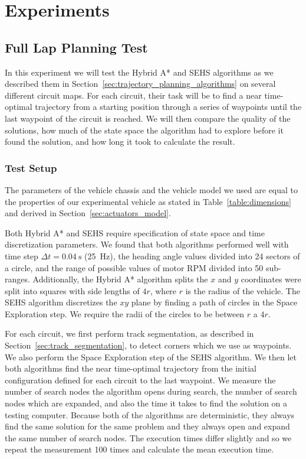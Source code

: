 \chapter{Experiments}
\label{chapter:experiments}


\section{Full Lap Planning Test}

In this experiment we will test the Hybrid A* and \gls{SEHS} algorithms as we described them in Section~\ref{sec:trajectory_planning_algorithms} on several different circuit maps. For each circuit, their task will be to find a near time-optimal trajectory from a starting position through a series of waypoints until the last waypoint of the circuit is reached. We will then compare the quality of the solutions, how much of the state space the algorithm had to explore before it found the solution, and how long it took to calculate the result.

\subsection{Test Setup}

The parameters of the vehicle chassis and the vehicle model we used are equal to the properties of our experimental vehicle as stated in Table~\ref{table:dimensions} and derived in Section~\ref{sec:actuators_model}.

Both Hybrid A* and \gls*{SEHS} require specification of state space and time discretization parameters. We found that both algorithms performed well with time step $\Delta t=\SI{0.04}{\second}$ (\SI{25}{\hertz}), the heading angle values divided into \num{24} sectors of a circle, and the range of possible values of motor \gls*{RPM} divided into \num{50} sub-ranges. Additionally, the Hybrid A* algorithm splits the $x$ and $y$ coordinates were split into squares with side lengths of $4r$, where $r$ is the radius of the vehicle. The SEHS algorithm discretizes the $xy$ plane by finding a path of circles in the Space Exploration step. We require the radii of the circles to be between $r$ a $4r$.

For each circuit, we first perform track segmentation, as described in Section~\ref{sec:track_segmentation}, to detect corners which we use as waypoints. We also perform the Space Exploration step of the SEHS algorithm. We then let both algorithms find the near time-optimal trajectory from the initial configuration defined for each circuit to the last waypoint. We measure the number of search nodes the algorithm opens during search, the number of search nodes which are expanded, and also the time it takes to find the solution on a testing computer. Because both of the algorithms are deterministic, they always find the same solution for the same problem and they always open and expand the same number of search nodes. The execution times differ slightly and so we repeat the measurement 100 times and calculate the mean execution time.

